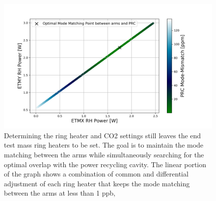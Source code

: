 \begin{figure}[ht]
\centering
\includegraphics[width=1.0 \textwidth]{../Figures/ETM_TCS_Settings.png}
\caption{Determining the ring heater and CO2 settings still leaves the end test mass ring heaters to be set.  The goal is to maintain the mode matching between the arms while simultaneously searching for the optimal overlap with the power recycling cavity. The linear portion of the graph shows a combination of common and differential adjustment of each ring heater that keeps the mode matching between the arms at less than 1 ppb, }
\label{fig:TCS_ETM}
\end{figure}